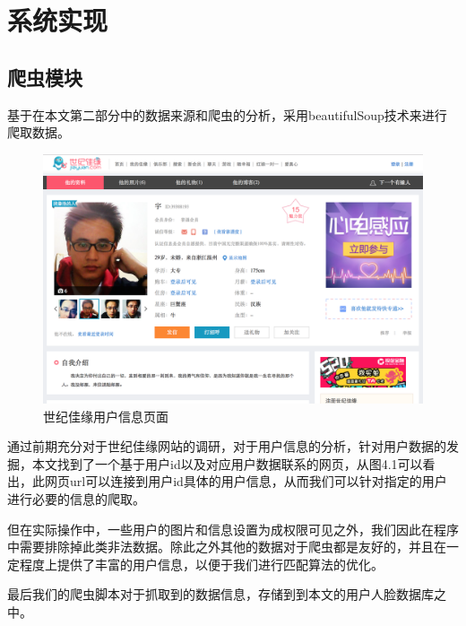 
\chapter{系统实现}
\section{爬虫模块}
基于在本文第二部分中的数据来源和爬虫的分析，采用beautifulSoup技术来进行爬取数据。
\begin{figure}[h]
\includegraphics[width=\textwidth]{img/chap4/jiayuan1.png}
\caption{世纪佳缘用户信息页面\label{Face++API}}
\end{figure}

通过前期充分对于世纪佳缘网站的调研，对于用户信息的分析，针对用户数据的发掘，本文找到了一个基于用户id以及对应用户数据联系的网页，从图4.1可以看出，此网页url可以连接到用户id具体的用户信息，从而我们可以针对指定的用户进行必要的信息的爬取。

但在实际操作中，一些用户的图片和信息设置为成权限可见之外，我们因此在程序中需要排除掉此类非法数据。除此之外其他的数据对于爬虫都是友好的，并且在一定程度上提供了丰富的用户信息，以便于我们进行匹配算法的优化。

最后我们的爬虫脚本对于抓取到的数据信息，存储到到本文的用户人脸数据库之中。

